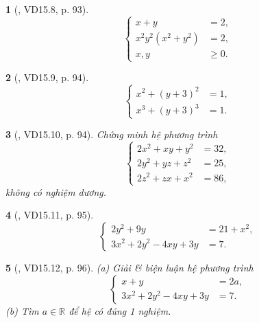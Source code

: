 \documentclass{article}
\newtheorem{baitoan}{}
\begin{document}
\begin{baitoan}[\cite{TLCT_THCS_Toan_9_dai_so}, VD15.8, p. 93]
	\begin{equation*}
		\left\{\begin{split}
			x + y &= 2,\\
			x^2y^2(x^2 + y^2) &= 2,\\
			x,y&\ge0.
		\end{split}\right.
	\end{equation*}
\end{baitoan}

\begin{baitoan}[\cite{TLCT_THCS_Toan_9_dai_so}, VD15.9, p. 94]
	\begin{equation*}
		\left\{\begin{split}
			x^2 + (y + 3)^2 &= 1,\\
			x^3 + (y + 3)^3 &= 1.
		\end{split}\right.
	\end{equation*}
\end{baitoan}

\begin{baitoan}[\cite{TLCT_THCS_Toan_9_dai_so}, VD15.10, p. 94]
	Chứng minh hệ phương trình
	\begin{equation*}
		\left\{\begin{split}
			2x^2 + xy + y^2 &= 32,\\
			2y^2 + yz + z^2 &= 25,\\
			2z^2 + zx + x^2 &= 86,
		\end{split}\right.
	\end{equation*}
	không có nghiệm dương.
\end{baitoan}

\begin{baitoan}[\cite{TLCT_THCS_Toan_9_dai_so}, VD15.11, p. 95]
	\begin{equation*}
		\left\{\begin{split}
			2y^2 + 9y &= 21 + x^2,\\
			3x^2 + 2y^2 - 4xy + 3y &= 7.
		\end{split}\right.
	\end{equation*}
\end{baitoan}

\begin{baitoan}[\cite{TLCT_THCS_Toan_9_dai_so}, VD15.12, p. 96]
	(a) Giải \& biện luận hệ phương trình
	\begin{equation*}
		\left\{\begin{split}
			x + y &= 2a,\\
			3x^2 + 2y^2 - 4xy + 3y &= 7.
		\end{split}\right.
	\end{equation*}
	(b) Tìm $a\in\mathbb{R}$ để hệ có đúng 1 nghiệm.
\end{baitoan}
\end{document}

